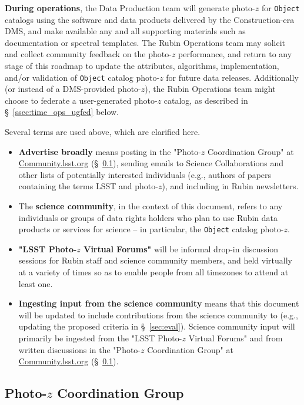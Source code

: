 \documentclass[DM,authoryear,toc]{lsstdoc}
\begin{document}
{\bf During operations}, the Data Production team will generate photo-$z$ for {\tt Object} catalogs using the software and data products delivered by the Construction-era DMS, and make available any and all supporting materials such as documentation or spectral templates.
The Rubin Operations team may solicit and collect community feedback on the photo-$z$ performance, and return to any stage of this roadmap to update the attributes, algorithms, implementation, and/or validation of {\tt Object} catalog photo-$z$ for future data releases.
Additionally (or instead of a DMS-provided photo-$z$), the Rubin Operations team might choose to federate a user-generated photo-$z$ catalog, as described in \S~\ref{ssec:time_ops_ugfed} below.

Several terms are used above, which are clarified here.
\begin{itemize}
\item {\bf Advertise broadly} means posting in the "Photo-$z$ Coordination Group" at \url{Community.lsst.org} (\S~\ref{ssec:time_pzcoord}), sending emails to Science Collaborations and other lists of potentially interested individuals (e.g., authors of papers containing the terms LSST and photo-$z$), and including in Rubin newsletters. \\
\item The {\bf science community}, in the context of this document, refers to any individuals or groups of data rights holders who plan to use Rubin data products or services for science -- in particular, the {\tt Object} catalog photo-$z$. \\
\item {\bf "LSST Photo-$z$ Virtual Forums"} will be informal drop-in discussion sessions for Rubin staff and science community members, and held virtually at a variety of times so as to enable people from all timezones to attend at least one. \\
\item {\bf Ingesting input from the science community} means that this document will be updated to include contributions from the science community to (e.g., updating the proposed criteria in \S~\ref{sec:eval}).
Science community input will primarily be ingested from the "LSST Photo-$z$ Virtual Forums" and from written discussions in the "Photo-$z$ Coordination Group" at \url{Community.lsst.org} (\S~\ref{ssec:time_pzcoord}).
\end{itemize}

\subsection{Photo-$z$ Coordination Group}\label{ssec:time_pzcoord}
\end{document}

